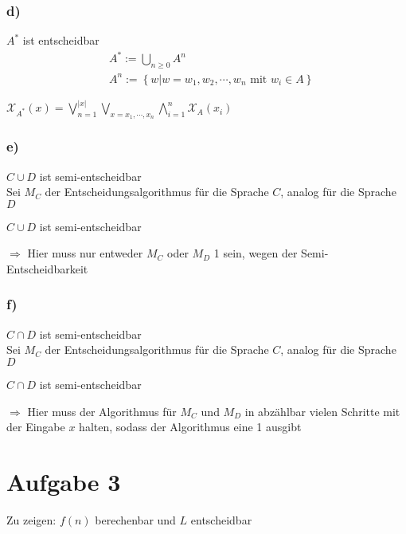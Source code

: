 \documentclass[a4paper,12pt]{article}
\begin{document}
	\subsubsection*{d)}
	$A^*$ ist entscheidbar
	\begin{align*}
		&A^* := \bigcup \limits_{n \geq 0} A^n\\
		&A^n := \left\lbrace w | w = w_1,w_2,\cdots,w_n \text{ mit } w_i \in A\right\rbrace
	\end{align*}
	\begin{center}
		$\mathcal{X}_{A^*} \left(x\right) = \bigvee \limits_{n=1} ^{\left|x\right|} \bigvee \limits_{x=x_1,\cdots,x_n} \bigwedge \limits_{i=1}^{n} \mathcal{X}_{A} \left(x_i\right)$
	\end{center}
	\newpage
	
	\subsubsection*{e)}
	$C \cup D$ ist semi-entscheidbar\\
	
	Sei $M_C$ der Entscheidungsalgorithmus für die Sprache $C$, analog für die Sprache $D$
	\begin{algorithm}[H]
		\caption{$C \cup D$ ist semi-entscheidbar}
	\end{algorithm}
	$\Rightarrow$ Hier muss nur entweder $M_C$ oder $M_D$ 1 sein, wegen der Semi-Entscheidbarkeit
	
	\subsubsection*{f)}
	$C \cap D$ ist semi-entscheidbar\\
	
	Sei $M_C$ der Entscheidungsalgorithmus für die Sprache $C$, analog für die Sprache $D$
	\begin{algorithm}[H]
		\caption{$C \cap D$ ist semi-entscheidbar}
	\end{algorithm}
	$\Rightarrow$ Hier muss der Algorithmus für $M_C$ und $M_D$ in abzählbar vielen Schritte mit der Eingabe $x$ halten, sodass der Algorithmus eine 1 ausgibt
	\newpage
	
	\section*{Aufgabe 3}
	Zu zeigen: $f\left(n\right)$ berechenbar und $L$ entscheidbar
\end{document}
